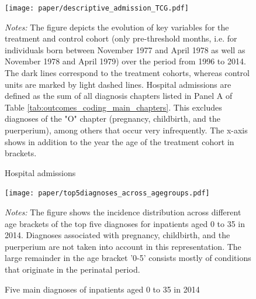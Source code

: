 \documentclass[11pt, a4paper]{article} %
\begin{document}
\newpage
\vspace*{\fill}
\begin{figure}[H]\centering
	\caption{Hospital admissions}\label{fig: descriptive_hospital_admission}
	\texttt{[image: paper/descriptive\_admission\_TCG.pdf]}
		\begin{minipage}{\linewidth}
		\scriptsize{\emph{Notes:} The figure depicts the evolution of key variables for the treatment and control cohort (only pre-threshold months, i.e. for individuals born between November 1977 and April 1978 as well as November 1978 and April 1979) over the period from 1996 to 2014. The dark lines correspond to the treatment cohorts, whereas control units are marked by light dashed lines. Hospital admissions are defined as the sum of all diagnosis chapters listed in Panel A of Table \ref{tab:outcomes_coding_main_chapters}. This excludes diagnoses of the "O" chapter (pregnancy, childbirth, and the puerperium), among others that occur very infrequently. The x-axis shows in addition to the year the age of the treatment cohort in brackets.} 
	\end{minipage}
\end{figure}
\vspace*{\fill}\clearpage
\vspace*{\fill}
\begin{figure}[H]\centering
	\caption{Five main diagnoses of inpatients aged 0 to 35 in 2014}\label{fig: top5diagnosis_in_2014_across_agegroups}
	\texttt{[image: paper/top5diagnoses\_across\_agegroups.pdf]}
	\begin{minipage}{\linewidth}
	\scriptsize{\emph{Notes:} The figure shows the incidence distribution across different age brackets of the top five diagnoses for inpatients aged 0 to 35 in 2014. Diagnoses associated with pregnancy, childbirth, and the puerperium are not taken into account in this representation. The large remainder in the age bracket '0-5' consists mostly of conditions that originate in the perinatal period.}
	\end{minipage}
\end{figure}
\vspace*{\fill}\clearpage
\end{document}
